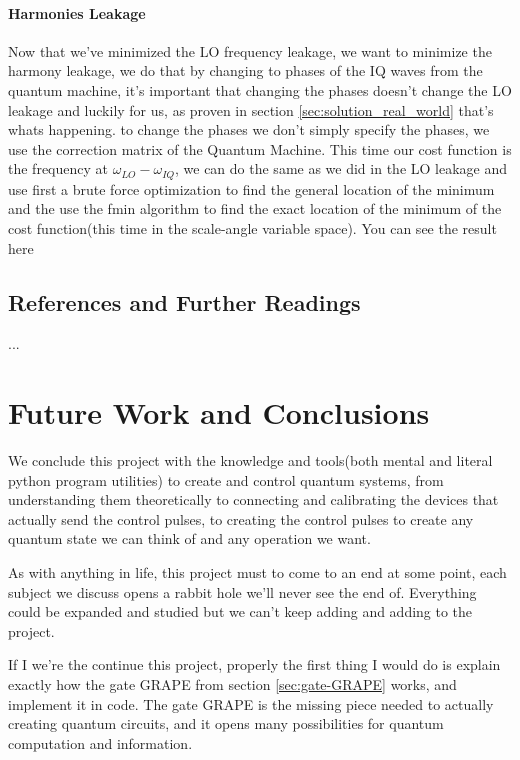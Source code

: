\documentclass[english, a4paper, 12pt, twoside]{article}
\numberwithin{equation}{section} %
\begin{document}
\paragraph{Harmonies Leakage}
Now that we've minimized the LO frequency leakage, we want to minimize the harmony leakage, we do that by changing to phases of the IQ waves from the quantum machine, it's important that changing the phases doesn't change the LO leakage and luckily for us, as proven in section \ref{sec:solution_real_world} that's whats happening. to change the phases we don't simply specify the phases, we use the correction matrix of the Quantum Machine. %
This time our cost function is the frequency at $\omega_{LO} - \omega_{IQ}$, we can do the same as we did in the LO leakage and use first a brute force optimization to find the general location of the minimum and the use the fmin algorithm to find the exact location of the minimum of the cost function(this time in the scale-angle variable space). You can see the result here
\subsection{References and Further Readings}
...

\newpage
\section{Future Work and Conclusions}
We conclude this project with the knowledge and tools(both mental and literal python program utilities) to create and control quantum systems, from understanding them theoretically to connecting and calibrating the devices that actually send the control pulses, to creating the control pulses to create any quantum state we can think of and any operation we want.

As with anything in life, this project must to come to an end at some point, each subject we discuss opens a rabbit hole we'll never see the end of. Everything could be expanded and studied but we can't keep adding and adding to the project.

If I we're the continue this project, properly the first thing I would do is explain exactly how the gate GRAPE from section \ref{sec:gate-GRAPE} works, and implement it in code. The gate GRAPE is the missing piece needed to actually creating quantum circuits, and it opens many possibilities for quantum computation and information.
\end{document}
